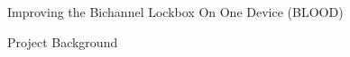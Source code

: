 \documentclass{project-proposal}
\begin{document}
\maintextfont

\makepageheader
    {Improving the Bichannel Lockbox On One Device (BLOOD)} %

Project Background
\end{document}
